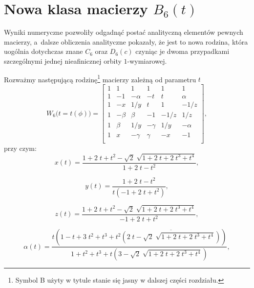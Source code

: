\documentclass[a4paper,12pt,twoside]{article}
\begin{document}

\section*{Nowa klasa macierzy $B_6(t)$}

Wyniki numeryczne pozwoli{\l}y odgadn\k{a}\'{c} posta\'{c} analityczn\k{a} element\'{o}w pewnych macierzy, a~dalsze obliczenia analityczne pokaza{\l}y, \.{z}e jest to nowa rodzina, kt\'{o}ra uog\'{o}lnia do\-tych\-czas znane $C_6$ oraz $D_6(c)$ czyni\k{a}c je dwoma przypadkami szczeg\'{o}lnymi jednej nie\-a\-fi\-nicz\-nej orbity $1$-wymiarowej.

Rozwa\.{z}my nast\k{e}puj\k{a}c\k{a} rodzin\k{e}\footnote{Symbol B u\.{z}yty w tytule stanie si\k{e} jasny w dalszej cz\k{e}\'{s}ci rozdzia{\l}u.} macierzy zale\.{z}n\k{a} od parametru $t$
\begin{equation}
W_6\big(t=t(\phi)\big) =
\left[
\begin{array}{rrrrrr}
1 &      1 &       1 &       1 &    1 &       1\\
1 &     -1 & -\alpha &      -t &    t &  \alpha\\
1 &     -x &     1/y &       t &    1 &    -1/z\\
1 & -\beta &   \beta &      -1 & -1/z &     1/z\\
1 &  \beta &     1/y & -\gamma &  1/y & -\alpha\\
1 &      x & -\gamma &  \gamma &   -x &      -1\\
\end{array}
\right],
\end{equation}
przy czym:
\begin{equation}
x(t) = \frac{1+2\;t+t^2-\sqrt{2}\;\sqrt{1+2\;t+2\;t^3+t^4}}{1+2\;t-t^2},
\end{equation}

\begin{equation}
y(t) = \frac{1+2\;t-t^2}{t(-1+2\;t+t^2)},
\end{equation}

\begin{equation}
z(t) = \frac{1+2\;t+t^2-\sqrt{2}\;\sqrt{1+2\;t+2\;t^3+t^4}}{-1+2\;t+t^2},
\end{equation}

\begin{equation}
\alpha(t) = \frac{t\left(1 - t + 3\;t^2 + t^3 + t^2 \overline{\left(2\; t - \sqrt{2}\; \sqrt{1 + 2\;t + 2\; t^3 + t^4} \right)}\right)}{1+t^2+t^3+t\left(3-\sqrt{2}\;\sqrt{1+2\;t+2\;t^3+t^4}\right)},
\end{equation}
\end{document}
